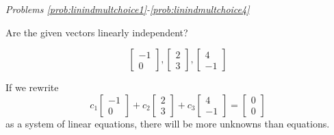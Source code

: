 \documentclass{ximera}
\begin{document}
\begin{problem}
\begin{enumerate}
\begin{multipleChoice}
 \end{multipleChoice}
    
\end{enumerate}
\end{problem}



\emph{Problems \ref{prob:linindmultchoice1}-\ref{prob:linindmultchoice4}}

 Are the given vectors linearly independent?

\begin{problem}\label{prob:linindmultchoice1}
$$\begin{bmatrix}-1\\0\end{bmatrix}, \begin{bmatrix}2\\3\end{bmatrix},\begin{bmatrix}4\\-1\end{bmatrix}$$

\begin{multipleChoice}
 \end{multipleChoice}
 \begin{hint}
 If we rewrite $$c_1\begin{bmatrix}-1\\0\end{bmatrix}+c_2 \begin{bmatrix}2\\3\end{bmatrix}+c_3\begin{bmatrix}4\\-1\end{bmatrix}=\begin{bmatrix}0\\0\end{bmatrix}$$ as a system of linear equations, there will be more unknowns than equations.
 \end{hint}
\end{problem}
\end{document}
